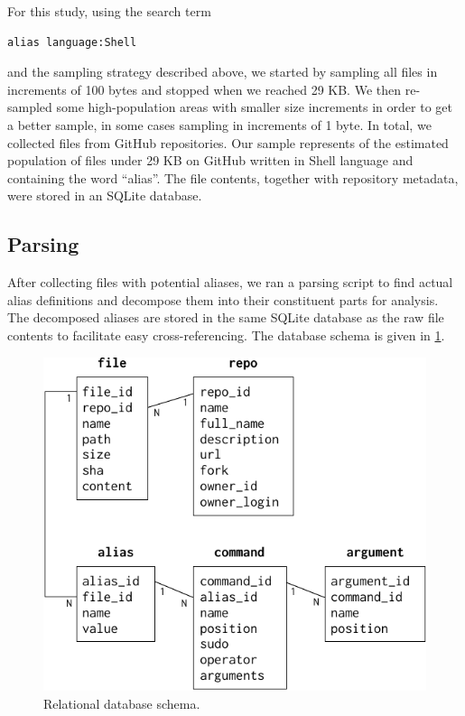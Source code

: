 For this study, using the search term
\begin{verbatim}
alias language:Shell
\end{verbatim}
and the sampling strategy described above, we started by sampling all files in increments of 100 bytes and stopped when we reached 29 KB.
We then re-sampled some high-population areas with smaller size increments in order to get a better sample, in some cases sampling in increments of 1 byte.
In total, we collected  files from  GitHub repositories.
Our sample represents  of the estimated population of  files under 29 KB on GitHub written in Shell language and containing the word ``alias''.
The file contents, together with repository metadata, were stored in an SQLite database.

\subsection{Parsing}

After collecting files with potential aliases, we ran a parsing script to find actual alias definitions and decompose them into their constituent parts for analysis.
The decomposed aliases are stored in the same SQLite database as the raw file contents to facilitate easy cross-referencing.
The database schema is given in \cref{fig:schema}.

\begin{figure}
    \centering
    \includegraphics[width=0.9\columnwidth]{schema.pdf}
    \caption{Relational database schema.}
    \label{fig:schema}
\end{figure}

